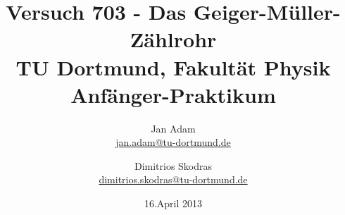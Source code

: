 



\title{Versuch 703 - Das Geiger-Müller-Zählrohr \\	%
\large TU Dortmund, Fakultät Physik\\
\normalsize Anfänger-Praktikum}

\author{Jan Adam\\	%
{\small \href{jan.adam@tu-dortmund.de}{jan.adam@tu-dortmund.de}}	%
\and	%
Dimitrios Skodras\\	%
{\small \href{dimitrios.skodras@tu-dortmund.de}{dimitrios.skodras@tu-dortmund.de}}	%
}
\date{16.April 2013}	%





\maketitle	%
\thispagestyle{empty} %



\tableofcontents


\newpage	%



